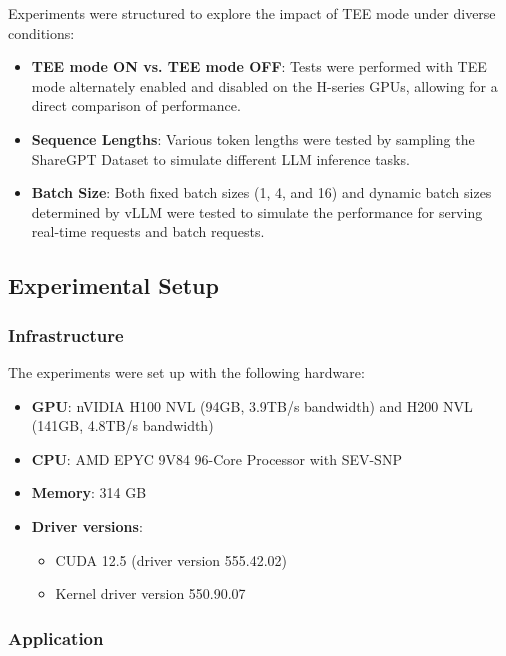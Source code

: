 \documentclass{article}
\begin{document}
Experiments were structured to explore the impact of TEE mode under diverse conditions:
\begin{itemize}
    \item \textbf{TEE mode ON vs. TEE mode OFF}: Tests were performed with TEE mode alternately enabled and disabled on the H-series GPUs, allowing for a direct comparison of performance.
    \item \textbf{Sequence Lengths}: Various token lengths were tested by sampling the ShareGPT Dataset \cite{sharegpt} to simulate different LLM inference tasks.
    \item \textbf{Batch Size}: Both fixed batch sizes (1, 4, and 16) and dynamic batch sizes determined by vLLM \cite{kwon2023efficient} were tested to simulate the performance for serving real-time requests and batch requests.
\end{itemize}

\subsection{Experimental Setup}

\subsubsection{Infrastructure}

The experiments were set up with the following hardware:

\begin{itemize}
    \item \textbf{GPU}: nVIDIA H100 NVL (94GB, 3.9TB/s bandwidth) and H200 NVL (141GB, 4.8TB/s bandwidth)
    \item \textbf{CPU}: AMD EPYC 9V84 96-Core Processor with SEV-SNP
    \item \textbf{Memory}: 314 GB
    \item \textbf{Driver versions}:
          \begin{itemize}
              \item CUDA 12.5 (driver version 555.42.02)
              \item Kernel driver version 550.90.07
          \end{itemize}
\end{itemize}

\subsubsection{Application}
\end{document}
